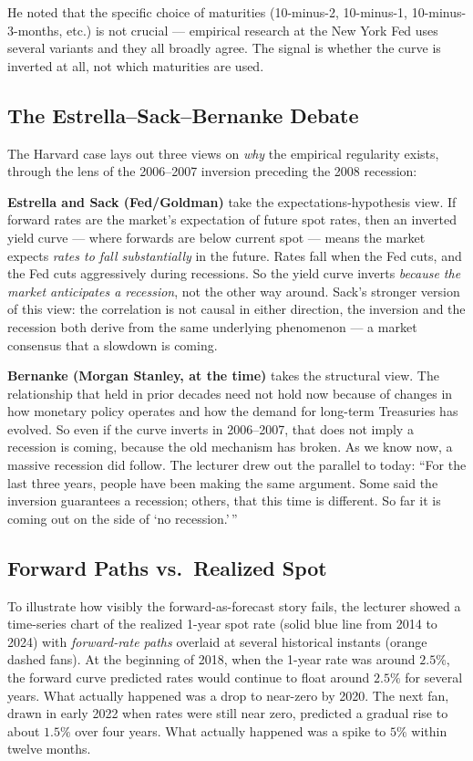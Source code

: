 He noted that the specific choice of maturities (10-minus-2, 10-minus-1,
10-minus-3-months, etc.) is not crucial --- empirical research at the New York
Fed uses several variants and they all broadly agree. The signal is whether
the curve is inverted at all, not which maturities are used.

\subsection{The Estrella--Sack--Bernanke Debate}\label{L2-sec:invyc-debate}

The Harvard case lays out three views on \emph{why} the empirical regularity
exists, through the lens of the 2006--2007 inversion preceding the 2008
recession:

\textbf{Estrella and Sack (Fed/Goldman)} take the expectations-hypothesis
view. If forward rates are the market's expectation of future spot rates,
then an inverted yield curve --- where forwards are below current spot ---
means the market expects \emph{rates to fall substantially} in the future.
Rates fall when the Fed cuts, and the Fed cuts aggressively during
recessions. So the yield curve inverts \emph{because the market anticipates a
recession}, not the other way around. Sack's stronger version of this view:
the correlation is not causal in either direction, the inversion and the
recession both derive from the same underlying phenomenon --- a market
consensus that a slowdown is coming.

\textbf{Bernanke (Morgan Stanley, at the time)} takes the structural view.
The relationship that held in prior decades need not hold now because of
changes in how monetary policy operates and how the demand for long-term
Treasuries has evolved. So even if the curve inverts in 2006--2007, that does
not imply a recession is coming, because the old mechanism has broken. As we
know now, a massive recession did follow. The lecturer drew out the parallel
to today: ``For the last three years, people have been making the same
argument. Some said the inversion guarantees a recession; others, that this
time is different. So far it is coming out on the side of `no recession.'\,''

\subsection{Forward Paths vs.~Realized Spot}\label{L2-sec:invyc-forwards}

To illustrate how visibly the forward-as-forecast story fails, the lecturer
showed a time-series chart of the realized 1-year spot rate (solid blue line
from 2014 to 2024) with \emph{forward-rate paths} overlaid at several
historical instants (orange dashed fans). At the beginning of 2018, when the
1-year rate was around $2.5\%$, the forward curve predicted rates would
continue to float around $2.5\%$ for several years. What actually happened was
a drop to near-zero by 2020. The next fan, drawn in early 2022 when rates
were still near zero, predicted a gradual rise to about $1.5\%$ over four
years. What actually happened was a spike to $5\%$ within twelve months.

